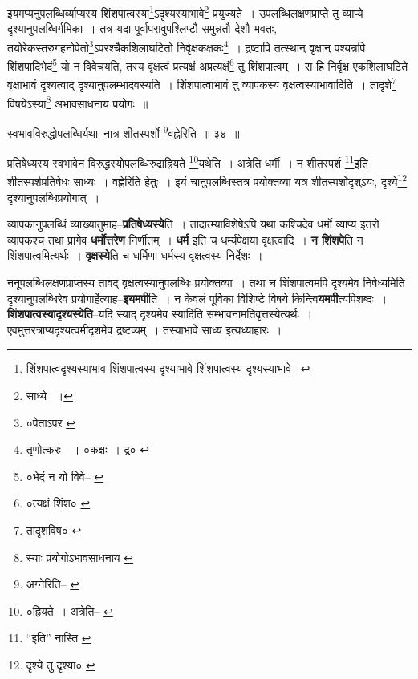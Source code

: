 \documentclass[article,12pt,a4paper]{memoir}
\begin{document}
	  \pstart इयमप्यनुपलब्धिर्व्याप्यस्य शिंशपात्वस्या\footnote{शिंशपात्वदृश्यस्याभाव \cite{dp-msB} शिंशपात्वस्य दृश्याभावे \cite{dp-msA} \cite{dp-edP} \cite{dp-edH} \cite{dp-edE} \cite{dp-edN} शिंशपात्वस्य दृश्यस्याभावे--\cite{dp-msC} \cite{dp-msD}}ऽदृश्यस्याभावे\footnote{साध्ये \cite{dp-msD-n} ।} प्रयुज्यते । उपलब्धिलक्षणप्राप्ते तु व्याप्ये दृश्यानुपलब्धिर्गमिका । तत्र यदा पूर्वापरावुपश्लिप्टौ समुन्नतौ देशौ भवतः, तयोरेकस्तरुगहनोपेतो\footnote{०पेताऽपर \cite{dp-msC}}ऽपरश्चैकशिलाघटितो निर्वृक्षकक्षकः\footnote{तृणोत्करः--\cite{dp-msD-n} । ०कक्षः । द्र० \cite{dp-msA} \cite{dp-msB} \cite{dp-msC} \cite{dp-msD} \cite{dp-edP} \cite{dp-edH} \cite{dp-edE} \cite{dp-edN}} । द्रष्टापि तत्स्थान् वृक्षान् पश्यन्नपि शिंशपादिभेदं\footnote{०भेदं न यो विवे--\cite{dp-msA} \cite{dp-edP} \cite{dp-edH} \cite{dp-edE}} यो न विवेचयति, तस्य वृक्षत्वं प्रत्यक्षं अप्रत्यक्षं\footnote{०त्यक्षं शिंश० \cite{dp-msA} \cite{dp-msB} \cite{dp-msC} \cite{dp-edH} \cite{dp-edE} \cite{dp-edN}} तु शिंशपात्वम् । स हि निर्वृक्ष एकशिलाघटिते वृक्षाभावं दृश्यत्वाद् दृश्यानुपलम्भादवस्यति । शिंशपात्वाभावं तु व्यापकस्य वृक्षत्वस्याभावादिति । तादृशे\footnote{तादृशविष० \cite{dp-msA}} विषयेऽस्या\footnote{स्याः प्रयोगोऽभावसाधनाय \cite{dp-msC}} अभावसाधनाय प्रयोगः ॥
	\pend
       
	  \bigskip
	  \begingroup
	

	  \pstart स्वभावविरुद्धोपलब्धिर्यथा--नात्र शीतस्पर्शो \footnote{अग्नेरिति--\cite{dp-msB} \cite{dp-edP} \cite{dp-edH} \cite{dp-edE} \cite{dp-edN}}वह्नेरिति ॥ ३४ ॥
	\pend
      
	  \endgroup
	 

	  \pstart प्रतिषेध्यस्य स्वभावेन विरुद्धस्योपलब्धिरुद्राह्रियते \footnote{०ह्रियते । अत्रेति--\cite{dp-msB} \cite{dp-msC} \cite{dp-msD}}यथेति । अत्रेति धर्मी । न शीतस्पर्श \footnote{“इति” नास्ति \cite{dp-msA}}इति शीतस्पर्शप्रतिषेधः साध्यः । वह्नेरिति हेतुः । इयं चानुपलब्धिस्तत्र प्रयोक्तव्या यत्र शीतस्पर्शोदृश्ऽयः, दृश्ये\footnote{दृश्ये तु दृश्या० \cite{dp-msB} \cite{dp-msC} \cite{dp-msD}} दृश्यानुपलब्धिप्रयोगात् ।
	\pend
      
	  \endgroup
	

	  \pstart व्यापकानुपलब्धिं व्याख्यातुमाह--\textbf{प्रतिषेध्यस्ये}ति । तादात्म्याविशेषेऽपि यथा कश्चिदेव धर्मो व्याप्य इतरो व्यापकश्च तथा प्रागेव \textbf{धर्मोत्तरेण} निर्णीतम् । \textbf{धर्म} इति च धर्म्यपेक्षया वृक्षत्वादि । \textbf{न शिंशपे}ति न शिंशपात्वमित्यर्थः । \textbf{वृक्षस्ये}ति च धर्मिणा धर्मस्य वृक्षत्वस्य निर्देशः ।
	\pend
      

	  \pstart ननूपलब्धिलक्षणप्राप्तस्य तावद् वृक्षत्वस्यानुपलब्धिः प्रयोक्तव्या । तथा च शिंशपात्वमपि दृश्यमेव निषेध्यमिति दृश्यानुपलब्धिरेव प्रयोगार्हेत्याह--\textbf{इयमपी}ति । न केवलं पूर्विका विशिष्टे विषये किन्त्वि\textbf{यमपी}त्यपिशब्दः । \textbf{शिंशपात्वस्यादृश्यस्येति}--यदि स्याद् दृश्यमेव स्यादिति सम्भावनामतिवृत्तस्येत्यर्थः । एवमुत्तरत्राप्यदृश्यत्वमीदृशमेव द्रष्टव्यम् । तस्याभावे साध्य इत्यध्याहारः ।
	\pend
      \leavevmode{}
	  \bigskip
	  \begingroup
	
\end{document}
